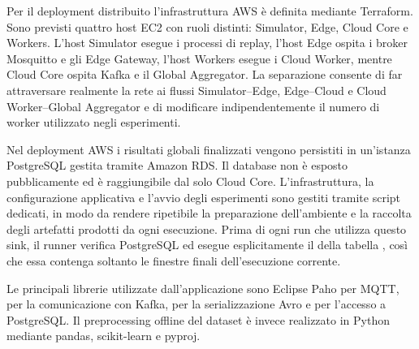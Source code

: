 Per il deployment distribuito l'infrastruttura AWS è definita mediante
Terraform. Sono previsti quattro host EC2 con ruoli distinti: Simulator, Edge,
Cloud Core e Workers. L'host Simulator esegue i processi di replay, l'host Edge
ospita i broker Mosquitto e gli Edge Gateway, l'host Workers esegue i Cloud Worker, mentre Cloud Core ospita Kafka e il Global Aggregator.
La separazione consente di far attraversare realmente la rete ai flussi
Simulator--Edge, Edge--Cloud e Cloud Worker--Global Aggregator e di modificare
indipendentemente il numero di worker utilizzato negli esperimenti.

Nel deployment AWS i risultati globali finalizzati vengono persistiti in
un'istanza PostgreSQL gestita tramite Amazon RDS. Il database non è esposto
pubblicamente ed è raggiungibile dal solo Cloud Core. L'infrastruttura, la
configurazione applicativa e l'avvio degli esperimenti sono gestiti tramite
script dedicati, in modo da rendere ripetibile la preparazione dell'ambiente
e la raccolta degli artefatti prodotti da ogni esecuzione. Prima di ogni run che utilizza questo
sink, il runner verifica PostgreSQL ed esegue esplicitamente il
 della tabella , così che essa contenga
soltanto le finestre finali dell'esecuzione corrente.

Le principali librerie utilizzate dall'applicazione sono Eclipse Paho per MQTT,
 per la comunicazione con Kafka,  per la
serializzazione Avro e  per l'accesso a PostgreSQL. Il preprocessing
offline del dataset è invece realizzato in Python mediante pandas,
scikit-learn e pyproj.
